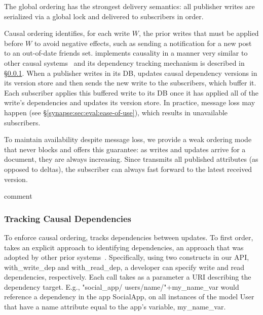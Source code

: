The global ordering has the strongest delivery semantics: all publisher writes are serialized via a global lock and delivered to subscribers in order.

Causal ordering identifies, for each write $W$, the prior writes that must
be applied before $W$ to avoid negative effects, such as sending a notification
for a new post to an out-of-date friends set.
\synapse implements causality in a manner very similar to other
causal systems~\cite{ahamad1995causal,Birman:1991:LCA:128738.128742,eiger,bolton}
and its dependency tracking mechanism is described in \S\ref{synapse:sec:arch:deps}.
When a publisher writes in its DB, \synapse updates causal dependency versions in its
version store and then sends the new write to the subscribers, which buffer it.
Each subscriber applies this buffered write to its DB once it has applied all
of the write's dependencies and updates its version store.
In practice, message loss may happen (see \S\ref{synapse:sec:eval:ease-of-use}), which
results in unavailable subscribers.

To maintain availability despite message loss, we provide a weak
ordering mode that never blocks and offers this guarantee: as writes and
updates arrive for a document, they are always increasing.
Since \synapse transmits all published attributes (as opposed to deltas), the subscriber can always fast forward to the latest received version.

   comment

\subsubsection{Tracking Causal Dependencies} \label{synapse:sec:arch:deps}

To enforce causal ordering, \synapse tracks dependencies between updates.  To
first order, \synapse takes an explicit approach to identifying
dependencies, an approach that was adopted by other prior
systems~\cite{bolton,cops,Bailis:2012:PDC:2391229.2391251}.
Specifically, using two constructs in
our API, {\code with\_write\_dep} and {\code with\_read\_dep}, a developer
can specify write and read dependencies, respectively.  Each call takes as a
parameter a URI describing the dependency target. E.g.,
{\code"social\_app/ users/name/"+my\_name\_var} would reference a dependency in
the app {\code SocialApp}, on all instances of the model {\code User} that have
a {\code name} attribute equal to the app's variable, {\code my\_name\_var}.

